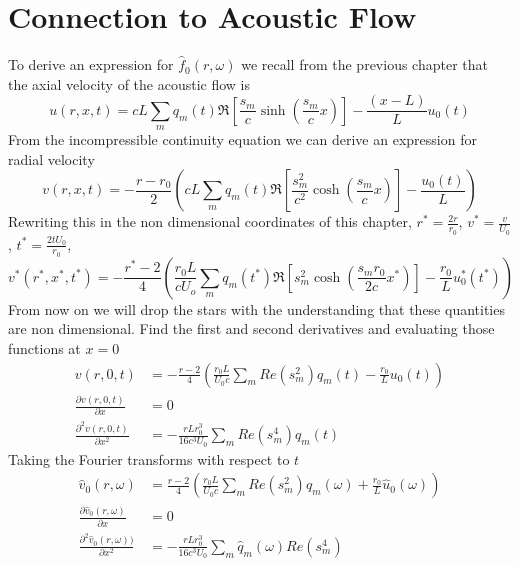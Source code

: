\documentclass[superscriptaddress, onecolumn, prl]{revtex4}
\begin{document}
\section{Connection to Acoustic Flow}
To derive an expression for $\hat{f}_0(r, \omega)$ we recall from the previous chapter that the axial velocity of the acoustic flow is
\begin{equation}
u(r, x,t) = c L \sum_m q_m(t) \Re \left[ \frac{s_m}{c} \sinh(\frac{s_m}{c} x) \right] - \frac{(x-L)}{L} u_0(t) 
\end{equation}
From the incompressible continuity equation we can derive an expression for radial velocity
\begin{equation}
v(r, x,t) = -\frac{r-r_0}{2}\left(c L \sum_m q_m(t) \Re \left[ \frac{s_m^2}{c^2} \cosh(\frac{s_m}{c} x) \right]- \frac{u_0(t)}{L}\right)
\end{equation}
Rewriting this in the non dimensional coordinates of this chapter, $r^* = \frac{2 r }{r_0}$, $v^* = \frac{v}{U_0}$, $t^* = \frac{2 t U_0}{r_0}$,  
\begin{equation}
v^*(r^*, x^*,t^*) = -\frac{r^* - 2}{4}\left(\frac{r_0 L}{c U_o} \sum_m q_m(t^*) \Re \left[ s_m^2 \cosh \left(\frac{s_m r_0}{2 c} x^* \right) \right]- \frac{r_0}{L} u_0^*(t^*)\right)
\end{equation}
From now on we will drop the stars with the understanding that these quantities are non dimensional. Find the first and second derivatives and evaluating those functions at $x=0$
\begin{equation}
\begin{split}
\label{eq:v_derivatives}
v(r,0,t) &= -\frac{r-2}{4} \left( \frac{r_0 L}{U_0 c}\sum_m Re(s_m^2) q_m(t) - \frac{r_0}{L} u_0(t) \right) \\
\frac{\partial v(r,0,t) }{\partial x} &= 0 \\
\frac{\partial^2 v(r,0,t)}{\partial x^2} &= -\frac{r L r_0^3}{16 c^3 U_0} \sum_m Re(s_m^4) q_m(t)
\end{split}
\end{equation}
Taking the Fourier transforms with respect to $t$
\begin{equation}
\begin{split}
\label{eq:v_transformed_derivatives}
\hat{v}_0(r, \omega) &= \frac{r-2}{4} \left( \frac{r_0 L}{U_0 c}\sum_m Re(s_m^2) \hat{q}_m(\omega) + \frac{r_0}{L} \hat{u}_0(\omega) \right) \\
\frac{\partial \hat{v}_0(r, \omega)}{\partial x} &= 0 \\
\frac{\partial^2 \hat{v}_0(r, \omega))}{\partial x^2} &= -\frac{r L r_0^3}{16 c^3 U_0} \sum_m \hat{q}_m(\omega) Re(s_m^4)
\end{split}
\end{equation}
\end{document}
